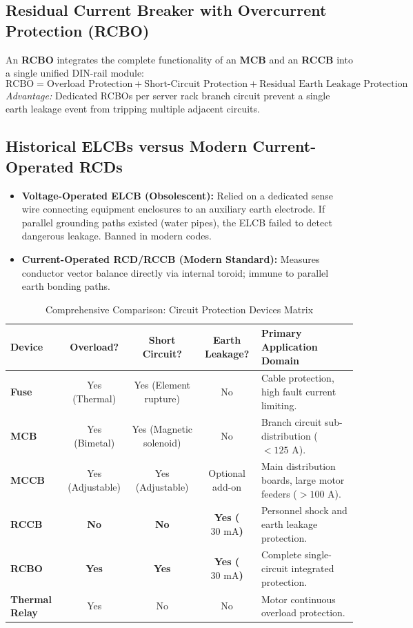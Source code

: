 \subsection{Residual Current Breaker with Overcurrent Protection (RCBO)}
An \textbf{RCBO} integrates the complete functionality of an \textbf{MCB} and an \textbf{RCCB} into a single unified DIN-rail module:
\begin{equation}
\label{eq:rcbo_integration}
\boxed{\text{RCBO} = \text{Overload Protection} + \text{Short-Circuit Protection} + \text{Residual Earth Leakage Protection}}
\end{equation}
\textit{Advantage:} Dedicated RCBOs per server rack branch circuit prevent a single earth leakage event from tripping multiple adjacent circuits.

\subsection{Historical ELCBs versus Modern Current-Operated RCDs}
\begin{itemize}
    \item \textbf{Voltage-Operated ELCB (Obsolescent):} Relied on a dedicated sense wire connecting equipment enclosures to an auxiliary earth electrode. If parallel grounding paths existed (water pipes), the ELCB failed to detect dangerous leakage. Banned in modern codes.
    \item \textbf{Current-Operated RCD/RCCB (Modern Standard):} Measures conductor vector balance directly via internal toroid; immune to parallel earth bonding paths.
\end{itemize}

\begin{table}[htbp]
\centering
\small
\caption{Comprehensive Comparison: Circuit Protection Devices Matrix}
\label{tab:protection_devices_matrix}
\begin{tabularx}{\textwidth}{l c c c X}
\toprule
\textbf{Device} & \textbf{Overload?} & \textbf{Short Circuit?} & \textbf{Earth Leakage?} & \textbf{Primary Application Domain} \\
\midrule
\textbf{Fuse} & Yes (Thermal) & Yes (Element rupture) & No & Cable protection, high fault current limiting. \\
\textbf{MCB} & Yes (Bimetal) & Yes (Magnetic solenoid) & No & Branch circuit sub-distribution ($<125\text{ A}$). \\
\textbf{MCCB} & Yes (Adjustable) & Yes (Adjustable) & Optional add-on & Main distribution boards, large motor feeders ($>100\text{ A}$). \\
\textbf{RCCB} & \textbf{No} & \textbf{No} & \textbf{Yes ($30\text{ mA}$)} & Personnel shock and earth leakage protection. \\
\textbf{RCBO} & \textbf{Yes} & \textbf{Yes} & \textbf{Yes ($30\text{ mA}$)} & Complete single-circuit integrated protection. \\
\textbf{Thermal Relay} & Yes & No & No & Motor continuous overload protection. \\
\bottomrule
\end{tabularx}
\end{table}


